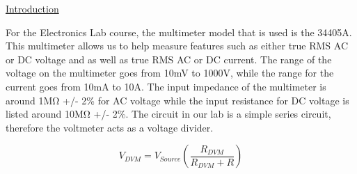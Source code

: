 \documentclass[a4paper,10pt]{article}
\begin{document}
	
\underline{Introduction}

For the Electronics Lab course, the multimeter model that is used is the 34405A. This multimeter allows us to help measure features such as either true RMS AC or DC voltage and as well as true RMS AC or DC current. The range of the voltage on the multimeter goes from 10mV to 1000V, while the range for the current goes from 10mA to 10A. The input impedance of the multimeter is around 1M\si{\ohm} +/- 2\% for AC voltage while the input resistance for DC voltage is listed around 10M\si{\ohm} +/- 2\%. The circuit in our lab is a simple series circuit, therefore the voltmeter acts as a voltage divider.

\begin{equation}
	\label{eq:vdvm}
	V_{DVM} = V_{Source}(\frac{R_{DVM}}{R_{DVM} + R}) 
\end{equation}
\end{document}

